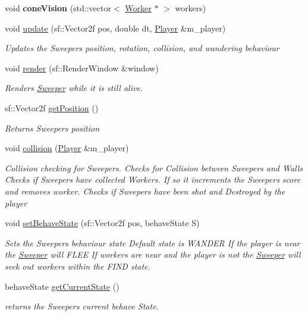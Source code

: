 \begin{DoxyCompactItemize}
\mbox{\label{class_sweeper_a8e6da37b5524e7abeacba40af61694c4}} 
void {\bfseries cone\+Vision} (std\+::vector$<$ \mbox{\hyperlink{class_worker}{Worker}} $\ast$ $>$ workers)
\item 
void \mbox{\hyperlink{class_sweeper_a393a95f7cc21803e0cd542392b201b42}{update}} (sf\+::\+Vector2f pos, double dt, \mbox{\hyperlink{class_player}{Player}} \&m\+\_\+player)
\begin{DoxyCompactList}\small\item\em Updates the Sweepers position, rotation, collision, and wandering behaviour \end{DoxyCompactList}\item 
void \mbox{\hyperlink{class_sweeper_a8308b5cec3c19e0292947081100d777b}{render}} (sf\+::\+Render\+Window \&window)
\begin{DoxyCompactList}\small\item\em Renders \mbox{\hyperlink{class_sweeper}{Sweeper}} while it is still alive. \end{DoxyCompactList}\item 
sf\+::\+Vector2f \mbox{\hyperlink{class_sweeper_a9fecea4436904ee3357a0b763f2c6c76}{get\+Position}} ()
\begin{DoxyCompactList}\small\item\em Returns Sweepers position \end{DoxyCompactList}\item 
void \mbox{\hyperlink{class_sweeper_a798701d04c6defb37e778da27a32054d}{collision}} (\mbox{\hyperlink{class_player}{Player}} \&m\+\_\+player)
\begin{DoxyCompactList}\small\item\em Collision checking for Sweepers. Checks for Collision between Sweepers and Walls Checks if Sweepers have collected Workers. If so it increments the Sweepers\textquotesingle{} score and removes worker. Checks if Sweepers have been shot and Destroyed by the player \end{DoxyCompactList}\item 
void \mbox{\hyperlink{class_sweeper_a557be93dd6ee042a2b7323350c244ae4}{set\+Behave\+State}} (sf\+::\+Vector2f pos, behave\+State S)
\begin{DoxyCompactList}\small\item\em Sets the Sweepers behaviour state Default state is W\+A\+N\+D\+ER If the player is near the \mbox{\hyperlink{class_sweeper}{Sweeper}} will F\+L\+EE If workers are near and the player is not the \mbox{\hyperlink{class_sweeper}{Sweeper}} will seek out workers within the F\+I\+ND state. \end{DoxyCompactList}\item 
behave\+State \mbox{\hyperlink{class_sweeper_a97c66e303a24b8c864ef74a39337f853}{get\+Current\+State}} ()
\begin{DoxyCompactList}\small\item\em returns the Sweepers current behave State. \end{DoxyCompactList}\end{DoxyCompactItemize}
